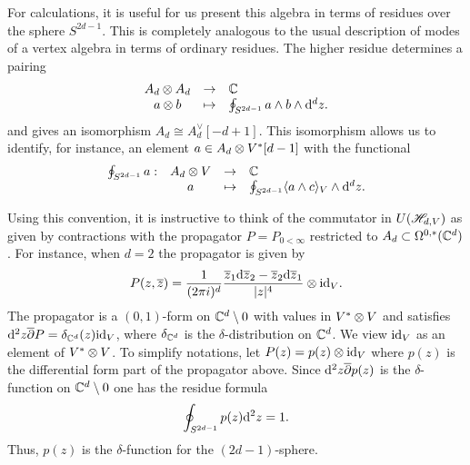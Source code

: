 For calculations, it is useful for us present this algebra in terms of residues over the sphere $S^{2d-1}$. 
This is completely analogous to the usual description of modes of a vertex algebra in terms of ordinary residues.
The higher residue determines a pairing
\[
\begin{array}{ccl}
 A_d \otimes A_d & \to &  \mathbb C \\
 a \otimes b & \mapsto & \oint_{S^{2d-1}} a \wedge b \wedge {\rm d}^d z .
 \end{array}
\]
and gives an isomorphism $A_d \cong A_d^\vee [-d + 1]$. 
This isomorphism allows us to identify, for instance, an element $a \in A_d \otimes V^*[d-1]$ with the functional 
\[
\begin{array}{cccl}
\oint_{S^{2d-1}} a  : & A_d \otimes V & \to & \mathbb C \\
& a & \mapsto & \oint_{S^{2d-1}} \langle a \wedge c\rangle_V \wedge {\rm d}^d z .
\end{array}
\]
\begin{rmk}
Using this convention, it is instructive to think of the commutator in $U(\mathscr H_{d,V})$ as given by contractions with the propagator $P = P_{0 < \infty}$ restricted to $A_d \subset \Omega^{0,*}(\mathbb C^d)$. 
For instance, when $d=2$ the propagator is given by
\[
P (z,\overline{z}) = \frac{1}{(2\pi i)^d} \frac{\overline{z}_1 {\rm d} \overline{z}_2 - \overline{z}_2 {\rm d} \overline{z}_1}{|z|^4} \otimes {\rm id}_{V} .
\]
The propagator is a $(0,1)$-form on $\mathbb C^d \setminus 0$ with values in $V^* \otimes V$ and satisfies ${\rm d}^2 z \overline{\partial} P = \delta_{\mathbb C^d} (z) {\rm id}_V$, where $\delta_{\mathbb C^d}$ is the $\delta$-distribution on $\mathbb C^d$. 
We view ${\rm id}_V$ as an element of $V^* \otimes V$. 
To simplify notations, let $P(z) = p(z) \otimes {\rm id}_V$ where $p(z)$ is the differential form part of the propagator above. 
Since ${\rm d}^2 z \overline{\partial} p(z)$ is the $\delta$-function on $\mathbb C^d \setminus 0$ one has the residue formula
\[
\oint_{S^{2d-1}} p(z) {\rm d}^2 z = 1 .
\]
Thus, $p(z)$ is the $\delta$-function for the $(2d-1)$-sphere.
\end{rmk}

